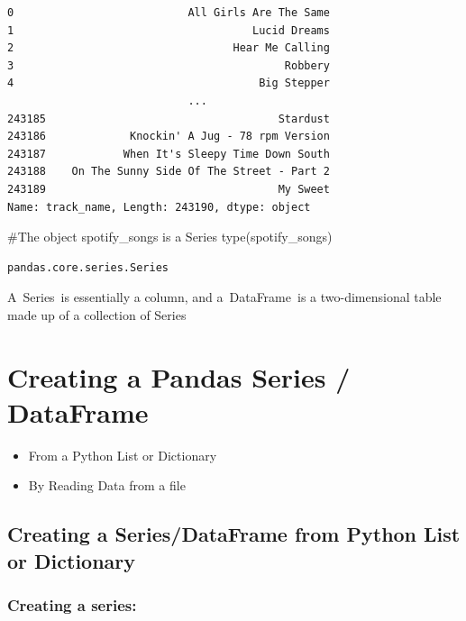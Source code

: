 \documentclass[
  letterpaper,
  DIV=11,
  numbers=noendperiod]{scrreprt}
\newenvironment{Shaded}{\begin{snugshade}}{\end{snugshade}}
\newcommand{\BuiltInTok}[1]{\textcolor[rgb]{0.00,0.23,0.31}{#1}}
\newcommand{\CommentTok}[1]{\textcolor[rgb]{0.37,0.37,0.37}{#1}}
\newcommand{\NormalTok}[1]{\textcolor[rgb]{0.00,0.23,0.31}{#1}}
\providecommand{\tightlist}{%
  \setlength{\itemsep}{0pt}\setlength{\parskip}{0pt}}\usepackage{longtable,booktabs,array}
\begin{document}
\begin{verbatim}
0                           All Girls Are The Same
1                                     Lucid Dreams
2                                  Hear Me Calling
3                                          Robbery
4                                      Big Stepper
                            ...                   
243185                                    Stardust
243186             Knockin' A Jug - 78 rpm Version
243187            When It's Sleepy Time Down South
243188    On The Sunny Side Of The Street - Part 2
243189                                    My Sweet
Name: track_name, Length: 243190, dtype: object
\end{verbatim}

\begin{Shaded}
\begin{Highlighting}[]
\CommentTok{\#The object spotify\_songs is a Series}
\BuiltInTok{type}\NormalTok{(spotify\_songs)}
\end{Highlighting}
\end{Shaded}

\begin{verbatim}
pandas.core.series.Series
\end{verbatim}

A~Series~is essentially a column, and a~DataFrame~is a two-dimensional
table made up of a collection of Series

\hypertarget{creating-a-pandas-series-dataframe}{%
\section{Creating a Pandas Series /
DataFrame}\label{creating-a-pandas-series-dataframe}}

\begin{itemize}
\tightlist
\item
  From a Python List or Dictionary
\item
  By Reading Data from a file
\end{itemize}

\hypertarget{creating-a-seriesdataframe-from-python-list-or-dictionary}{%
\subsection{Creating a Series/DataFrame from Python List or
Dictionary}\label{creating-a-seriesdataframe-from-python-list-or-dictionary}}

\hypertarget{creating-a-series}{%
\subsubsection{Creating a series:}\label{creating-a-series}}
\end{document}
